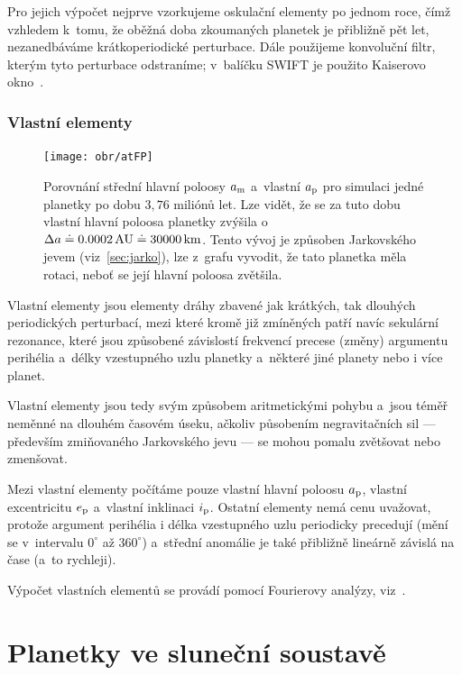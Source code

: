 \documentclass[A4paper, 12pt, oneside]{book}
\begin{document}
Pro jejich výpočet nejprve vzorkujeme oskulační elementy po jednom roce, čímž vzhledem k~tomu, že oběžná doba zkoumaných planetek je přibližně pět let, nezanedbáváme krátkoperiodické perturbace. Dále použijeme konvoluční filtr, kterým tyto perturbace odstraníme; v~balíčku SWIFT je použito Kaiserovo okno~\cite{quinn91}.

\subsection{Vlastní elementy}

\begin{figure}
	\centering
	\texttt{[image: obr/atFP]}
	\caption{Porovnání střední hlavní poloosy $a_{\rm m}$ a~vlastní $a_{\rm p}$ pro simulaci jedné planetky po dobu $3,76$ miliónů let. Lze vidět, že se za tuto dobu vlastní hlavní poloosa planetky zvýšila o~$\Delta a\doteq0.0002\,{\rm AU}\doteq30000\, {\rm km}$. Tento vývoj je způsoben Jarkovského jevem (viz~\ref{sec:jarko}), lze z~grafu vyvodit, že tato planetka měla  rotaci, neboť se její hlavní poloosa zvětšila.}
	\label{atFP}
\end{figure}

Vlastní elementy jsou elementy dráhy zbavené jak krátkých, tak dlouhých periodických perturbací, mezi které kromě již zmíněných patří navíc sekulární rezonance, které jsou způsobené závislostí frekvencí precese (změny) argumentu perihélia a~délky vzestupného uzlu planetky a~některé jiné planety nebo i více planet.

Vlastní elementy jsou tedy svým způsobem aritmetickými  pohybu a~jsou téměř neměnné na dlouhém časovém úseku, ačkoliv působením negravitačních sil --- především zmiňovaného Jarkovského jevu --- se mohou pomalu zvětšovat nebo zmenšovat. 

Mezi vlastní elementy počítáme pouze vlastní hlavní poloosu $a_{\rm p}$, vlastní excentricitu $e_{\rm p}$ a~vlastní inklinaci $i_{\rm p}$. Ostatní elementy nemá cenu uvažovat, protože argument perihélia i délka vzestupného uzlu periodicky precedují (mění se v~intervalu $0^\circ$ až $360^\circ$) a~střední anomálie je také přibližně lineárně závislá na čase (a~to rychleji).

Výpočet vlastních elementů se provádí pomocí Fourierovy analýzy, viz~\cite{sidlichovsky96}. 

\chapter{Planetky ve sluneční soustavě} \label{ch:planetky}
\end{document}
